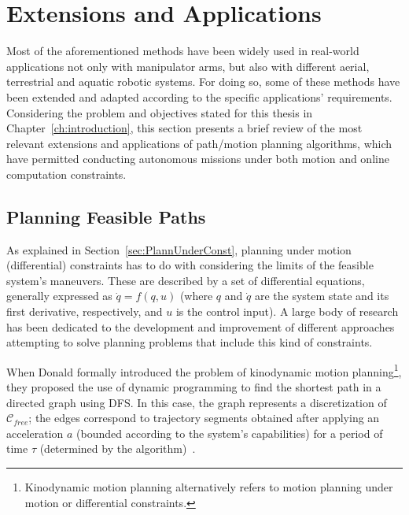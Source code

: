 \section{Extensions and Applications}
\label{sec:ExtensionsApplications}

Most of the aforementioned methods have been widely used in real-world
applications not only with manipulator arms, but also with different aerial,
terrestrial and aquatic robotic systems. For doing so, some of these methods
have been extended and adapted according to the specific applications'
requirements. Considering the problem and objectives stated for this thesis in
Chapter~\ref{ch:introduction}, this section presents a brief review of the most
relevant extensions and applications of path/motion planning algorithms, which
have permitted conducting autonomous missions under both motion and online
computation constraints.

\subsection{Planning Feasible Paths}
\label{sec:motion_constraints_review}

As explained in Section~\ref{sec:PlannUnderConst}, planning under motion
(differential) constraints has to do with considering the limits of the feasible
system's maneuvers. These are described by a set of differential equations,
generally expressed as $\dot{q}=f\left(q,u\right)$ (where $q$ and $\dot{q}$ are
the system state and its first derivative, respectively, and $u$ is the control
input). A large body of research has been dedicated to the development and
improvement of different approaches attempting to solve planning problems that
include this kind of constraints.

When Donald \etal formally introduced the problem of kinodynamic motion
planning\footnote{Kinodynamic motion planning alternatively refers to motion
planning under motion or differential constraints.}, they proposed the use of
dynamic programming to find the shortest path in a directed graph using
\ac{DFS}. In this case, the graph represents a discretization of
$\mathcal{C}_{free}$; the edges correspond to trajectory segments obtained after
applying an acceleration $a$ (bounded according to the system's capabilities)
for a period of time $\tau$ (determined by the algorithm)~\cite{Donald1993}.

